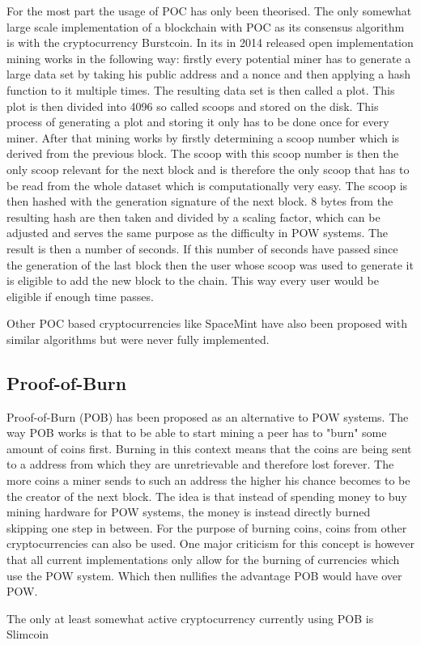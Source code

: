 For the most part the usage of POC has only been theorised. The only somewhat large scale implementation of a blockchain with POC as its consensus algorithm is with the cryptocurrency Burstcoin. In
its in 2014 released open implementation mining works in the following way: firstly every potential miner has to generate a large data set by taking his public address and a nonce and then applying a
hash function to it multiple times. The resulting data set is then called a plot. This plot is then divided into 4096 so called scoops and stored on the disk. This process of generating a plot and
storing it only has to be done once for every miner. After that mining works by firstly determining a scoop number which is derived from the previous block. The scoop with this scoop number is then
the only scoop relevant for the next block and is therefore the only scoop that has to be read from the whole dataset which is computationally very easy. The scoop is then hashed with the generation
signature of the next block. 8 bytes from the resulting hash are then taken and divided by a scaling factor, which can be adjusted and serves the same purpose as the difficulty in POW systems. The
result is then a number of seconds. If this number of seconds have passed since the generation of the last block then the user whose scoop was used to generate it is eligible to add the new block to
the chain. This way every user would be eligible if enough time passes.\cite{url:burstcoin}\par Other POC based cryptocurrencies like SpaceMint have also been proposed with similar algorithms but were
never fully implemented.\cite{url:spacemint}

\subsection{Proof-of-Burn}

Proof-of-Burn (POB) has been proposed as an alternative to POW systems. The way POB works is that to be able to start mining a peer has to "burn" some amount of coins first. Burning in this context
means that the coins are being sent to a address from which they are unretrievable and therefore lost forever. The more coins a miner sends to such an address the higher his chance becomes to be the
creator of the next block. The idea is that instead of spending money to buy mining hardware for POW systems, the money is instead directly burned skipping one step in between. For the purpose of
burning coins, coins from other cryptocurrencies can also be used. One major criticism for this concept is however that all current implementations only allow for the burning of currencies which use
the POW system. Which then nullifies the advantage POB would have over POW.\par The only at least somewhat active cryptocurrency currently using POB is Slimcoin\cite{url:pob}

